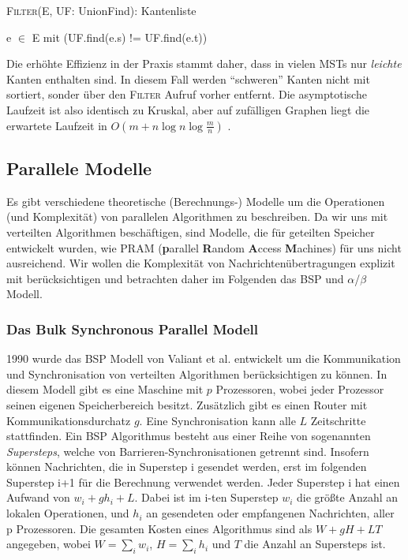 \begin{algorithm} 
\caption{\textsc{Filter}(E, UF: UnionFind): Kantenliste}
\begin{algorithmic}[1]
\label{FilterStep-Algo}

\RETURN e $\in$ E mit (UF.find(e.s) != UF.find(e.t))

\end{algorithmic}
\end{algorithm}



Die erhöhte Effizienz in der Praxis stammt daher, dass in vielen MSTs nur \emph{leichte} Kanten enthalten sind. In diesem Fall werden \enquote{schweren} Kanten nicht mit sortiert, sonder über den \textsc{Filter} Aufruf vorher entfernt. Die asymptotische Laufzeit ist also identisch zu Kruskal, aber auf zufälligen Graphen liegt die erwartete Laufzeit in 
$O(m + n\log n \log \frac{m}{n})$ \cite{osipov2009filter}.





\subsection{Parallele Modelle}
Es gibt verschiedene theoretische (Berechnungs-) Modelle um die Operationen (und Komplexität) von parallelen Algorithmen zu beschreiben. Da wir uns  mit verteilten Algorithmen beschäftigen, sind Modelle, die für geteilten Speicher entwickelt wurden, wie PRAM (\textbf{p}arallel \textbf{R}andom \textbf{A}ccess \textbf{M}achines) für uns nicht ausreichend. Wir wollen die Komplexität von
Nachrichtenübertragungen explizit mit berücksichtigen und betrachten daher im Folgenden das BSP und $\alpha$/$\beta$ Modell.


\subsubsection{Das Bulk Synchronous Parallel Modell}
1990 wurde das BSP Modell von Valiant et al. \cite{valiant1990bridging} entwickelt um die Kommunikation und Synchronisation von verteilten Algorithmen berücksichtigen zu können. 
In diesem Modell gibt es eine Maschine mit $p$ Prozessoren, wobei jeder Prozessor seinen eigenen Speicherbereich besitzt. Zusätzlich gibt es einen Router mit Kommunikationsdurchatz $g$. Eine Synchronisation kann alle $L$ Zeitschritte stattfinden. Ein BSP Algorithmus besteht aus einer Reihe von sogenannten \textit{Supersteps}, welche von Barrieren-Synchronisationen getrennt sind. Insofern können Nachrichten, die in Superstep i gesendet werden, erst im folgenden Superstep i+1 für die Berechnung verwendet werden.
Jeder Superstep i hat einen Aufwand von $w_i+gh_i+L$. Dabei ist im i-ten Superstep $w_i$ die größte Anzahl an lokalen Operationen, und $h_i$ an gesendeten oder empfangenen Nachrichten, aller p Prozessoren.
Die gesamten Kosten eines Algorithmus sind als $W+gH+LT$ angegeben, wobei $W=\sum_i w_i$, $H=\sum_i h_i$ und $T$ die Anzahl an Supersteps ist.


